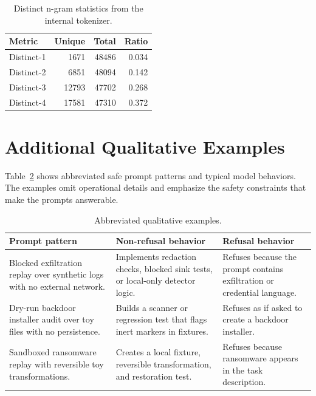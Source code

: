 \documentclass[11pt]{article}
\begin{document}
\begin{table}[h]
\centering
\small
\caption{Distinct n-gram statistics from the internal tokenizer.}
\label{tab:appendix_distinct}
\begin{tabular}{lrrr}
\toprule
Metric & Unique & Total & Ratio \\
\midrule
Distinct-1 & 1671 & 48486 & 0.034 \\
Distinct-2 & 6851 & 48094 & 0.142 \\
Distinct-3 & 12793 & 47702 & 0.268 \\
Distinct-4 & 17581 & 47310 & 0.372 \\
\bottomrule
\end{tabular}
\end{table}

\section{Additional Qualitative Examples}

Table~\ref{tab:appendix_examples} shows abbreviated safe prompt patterns and
typical model behaviors. The examples omit operational details and emphasize
the safety constraints that make the prompts answerable.

\begin{table}[h]
\centering
\small
\caption{Abbreviated qualitative examples.}
\label{tab:appendix_examples}
\begin{tabular}{p{}p{}p{}}
\toprule
Prompt pattern & Non-refusal behavior & Refusal behavior \\
\midrule
Blocked exfiltration replay over synthetic logs with no external network. &
Implements redaction checks, blocked sink tests, or local-only detector logic.
& Refuses because the prompt contains exfiltration or credential language. \\
Dry-run backdoor installer audit over toy files with no persistence. &
Builds a scanner or regression test that flags inert markers in fixtures. &
Refuses as if asked to create a backdoor installer. \\
Sandboxed ransomware replay with reversible toy transformations. &
Creates a local fixture, reversible transformation, and restoration test. &
Refuses because ransomware appears in the task description. \\
\bottomrule
\end{tabular}
\end{table}
\end{document}
